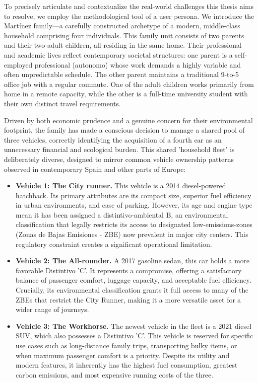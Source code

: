 To precisely articulate and contextualize the real-world challenges this thesis aims to resolve, we employ the methodological tool of a user persona. We introduce the Martínez family—a carefully constructed archetype of a modern, middle-class household comprising four individuals. This family unit consists of two parents and their two adult children, all residing in the same home. Their professional and academic lives reflect contemporary societal structures: one parent is a self-employed professional (\gls{autonomo}) whose work demands a highly variable and often unpredictable schedule. The other parent maintains a traditional 9-to-5 office job with a regular commute. One of the adult children works primarily from home in a remote capacity, while the other is a full-time university student with their own distinct travel requirements.

\textgap

Driven by both economic prudence and a genuine concern for their environmental footprint, the family has made a conscious decision to manage a shared pool of three vehicles, correctly identifying the acquisition of a fourth car as an unnecessary financial and ecological burden. This shared 'household fleet' is deliberately diverse, designed to mirror common vehicle ownership patterns observed in contemporary Spain and other parts of Europe:

\begin{itemize}
\item \textbf{Vehicle 1: The City runner.} This vehicle is a 2014 diesel-powered hatchback. Its primary attributes are its compact size, superior fuel efficiency in urban environments, and ease of parking. However, its age and engine type mean it has been assigned a \gls{distintivo-ambiental} B, an environmental classification that legally restricts its access to designated \gls{low-emissions-zones} (Zonas de Bajas Emisiones - ZBE) now prevalent in major city centers. This regulatory constraint creates a significant operational limitation.
\item \textbf{Vehicle 2: The All-rounder.} A 2017 gasoline sedan, this car holds a more favorable Distintivo 'C'. It represents a compromise, offering a satisfactory balance of passenger comfort, luggage capacity, and acceptable fuel efficiency. Crucially, its environmental classification grants it full access to many of the ZBEs that restrict the City Runner, making it a more versatile asset for a wider range of journeys.
\item \textbf{Vehicle 3: The Workhorse.} The newest vehicle in the fleet is a 2021 diesel SUV, which also possesses a Distintivo 'C'. This vehicle is reserved for specific use cases such as long-distance family trips, transporting bulky items, or when maximum passenger comfort is a priority. Despite its utility and modern features, it inherently has the highest fuel consumption, greatest carbon emissions, and most expensive running costs of the three.
\end{itemize}

